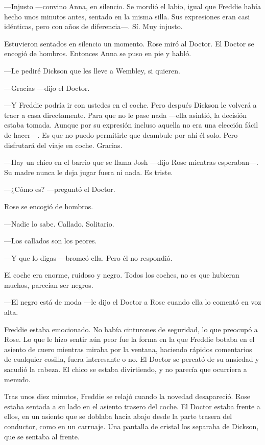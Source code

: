 {---Injusto ---convino Anna, en silencio. Se mordió el labio, igual que
	Freddie había hecho unos minutos antes, sentado en la misma silla. Sus
	expresiones eran casi idénticas, pero con años de diferencia---. Sí. Muy
injusto.}

{Estuvieron sentados en silencio un momento. Rose miró al Doctor. El
Doctor se encogió de hombros. Entonces Anna se puso en pie y habló.}

{---Le pediré Dickson que les lleve a Wembley, si quieren.}

{---Gracias ---dijo el Doctor.}

{---Y Freddie podría ir con ustedes en el coche. Pero después Dickson le
	volverá a traer a casa directamente. Para que no le pase nada ---ella
	asintió, la decisión estaba tomada. Aunque por su expresión incluso
	aquella no era una elección fácil de hacer---. Es que no puedo
	permitirle que deambule por ahí él solo. Pero disfrutará del viaje en
coche. Gracias.}

{---Hay un chico en el barrio que se llama Josh ---dijo Rose mientras
esperaban---. Su madre nunca le deja jugar fuera ni nada. Es triste.}

{---¿Cómo es? ---preguntó el Doctor.}

{Rose se encogió de hombros.}

{---Nadie lo sabe. Callado. Solitario.}

{---Los callados son los peores.}

{---Y que lo digas ---bromeó ella. Pero él no respondió.}

{El coche era enorme, ruidoso y negro. Todos los coches, no es que
hubieran muchos, parecían ser negros.}

{---El negro está de moda ---le dijo el Doctor a Rose cuando ella lo
comentó en voz alta.}

{Freddie estaba emocionado. No había cinturones de seguridad, lo que
	preocupó a Rose. Lo que le hizo sentir aún peor fue la forma en la que
	Freddie botaba en el asiento de cuero mientras miraba por la ventana,
	haciendo rápidos comentarios de cualquier cosilla, fuera interesante o
	no. El Doctor se percató de su ansiedad y sacudió la cabeza. El chico se
estaba divirtiendo, y no parecía que ocurriera a menudo.}

{Tras unos diez minutos, Freddie se relajó cuando la novedad
	desapareció. Rose estaba sentada a su lado en el asiento trasero del
	coche. El Doctor estaba frente a ellos, en un asiento que se doblaba
	hacia abajo desde la parte trasera del conductor, como en un carruaje.
	Una pantalla de cristal los separaba de Dickson, que se sentaba al
frente.}

